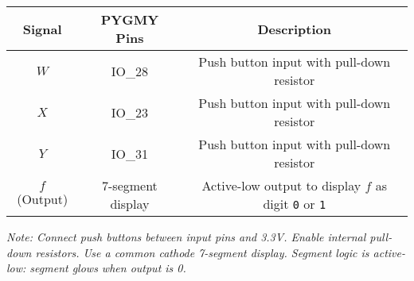 \documentclass[12pt]{article}
\begin{document}
\begin{tabular}{|c|c|c|}
\hline
\textbf{Signal} & \textbf{PYGMY Pins} & \textbf{Description} \\
\hline
\(W\) & IO\_28 & Push button input with pull-down resistor \\
\(X\) & IO\_23 & Push button input with pull-down resistor \\
\(Y\) & IO\_31 & Push button input with pull-down resistor \\
\(f\) (Output) & 7-segment display & Active-low output to display \(f\) as digit \texttt{0} or \texttt{1} \\
\hline
\end{tabular}

\bigskip
\textit{Note: Connect push buttons between input pins and 3.3V.  
Enable internal pull-down resistors.  
Use a common cathode 7-segment display.  
Segment logic is active-low: segment glows when output is 0.}
\end{document}
